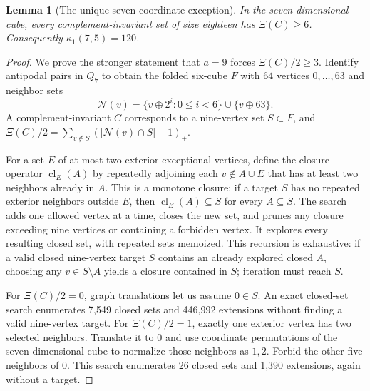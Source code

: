 \documentclass[11pt,a4paper]{article}
\newtheorem{lemma}[theorem]{Lemma}
\begin{document}
\begin{lemma}[The unique seven-coordinate exception]\label{lem:v7seven}
In the seven-dimensional cube, every complement-invariant set of size eighteen has $\Xi(C)\ge6$. Consequently $\kappa_1(7,5)=120$.
\end{lemma}
\begin{proof}
We prove the stronger statement that $a=9$ forces $\Xi(C)/2\ge3$. Identify antipodal pairs in $Q_7$ to obtain the folded six-cube $F$ with $64$ vertices $0,\ldots,63$ and neighbor sets
\[
 \mathcal N(v)=\{v\oplus2^i:0\le i<6\}\cup\{v\oplus63\}.
\]
A complement-invariant $C$ corresponds to a nine-vertex set $S\subset F$, and $\Xi(C)/2=\sum_{v\notin S}(\lvert\mathcal N(v)\cap S\rvert-1)_+$.

For a set $E$ of at most two exterior exceptional vertices, define the closure operator $\operatorname{cl}_E(A)$ by repeatedly adjoining each $v\notin A\cup E$ that has at least two neighbors already in $A$. This is a monotone closure: if a target $S$ has no repeated exterior neighbors outside $E$, then $\operatorname{cl}_E(A)\subseteq S$ for every $A\subseteq S$. The search adds one allowed vertex at a time, closes the new set, and prunes any closure exceeding nine vertices or containing a forbidden vertex. It explores every resulting closed set, with repeated sets memoized. This recursion is exhaustive: if a valid closed nine-vertex target $S$ contains an already explored closed $A$, choosing any $v\in S\setminus A$ yields a closure contained in $S$; iteration must reach $S$.

For $\Xi(C)/2=0$, graph translations let us assume $0\in S$. An exact closed-set search enumerates 7,549 closed sets and 446,992 extensions without finding a valid nine-vertex target. For $\Xi(C)/2=1$, exactly one exterior vertex has two selected neighbors. Translate it to $0$ and use coordinate permutations of the seven-dimensional cube to normalize those neighbors as $1,2$. Forbid the other five neighbors of $0$. This search enumerates 26 closed sets and 1,390 extensions, again without a target.


\end{proof}
\end{document}
